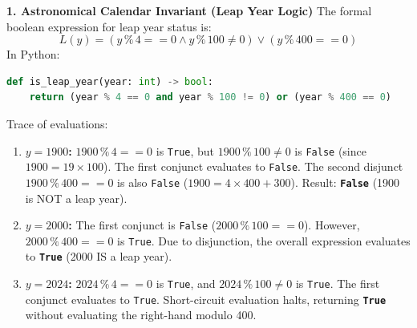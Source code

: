 \textbf{1. Astronomical Calendar Invariant (Leap Year Logic)}
The formal boolean expression for leap year status is:
\begin{equation*}
L(y) = (y \mathbin{\%} 4 == 0 \land y \mathbin{\%} 100 \neq 0) \lor (y \mathbin{\%} 400 == 0)
\end{equation*}
In Python:
\begin{lstlisting}[language=Python]
def is_leap_year(year: int) -> bool:
    return (year % 4 == 0 and year % 100 != 0) or (year % 400 == 0)
\end{lstlisting}
Trace of evaluations:
\begin{enumerate}
    \item \textbf{$y = 1900$:} $1900 \mathbin{\%} 4 == 0$ is \texttt{True}, but $1900 \mathbin{\%} 100 \neq 0$ is \texttt{False} (since $1900 = 19 \times 100$). The first conjunct evaluates to \texttt{False}. The second disjunct $1900 \mathbin{\%} 400 == 0$ is also \texttt{False} ($1900 = 4 \times 400 + 300$). Result: \textbf{\texttt{False}} (1900 is NOT a leap year).
    \item \textbf{$y = 2000$:} The first conjunct is \texttt{False} ($2000 \mathbin{\%} 100 == 0$). However, $2000 \mathbin{\%} 400 == 0$ is \texttt{True}. Due to disjunction, the overall expression evaluates to \textbf{\texttt{True}} (2000 IS a leap year).
    \item \textbf{$y = 2024$:} $2024 \mathbin{\%} 4 == 0$ is \texttt{True}, and $2024 \mathbin{\%} 100 \neq 0$ is \texttt{True}. The first conjunct evaluates to \texttt{True}. Short-circuit evaluation halts, returning \textbf{\texttt{True}} without evaluating the right-hand modulo 400.
\end{enumerate}

